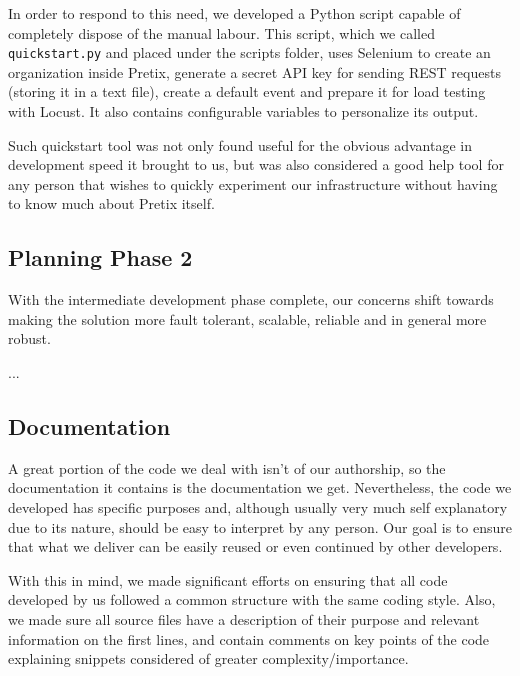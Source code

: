\documentclass[12pt]{article}
\begin{document}
In order to respond to this need, we developed a Python script capable of completely dispose of the manual labour.
This script, which we called \texttt{quickstart.py} and placed under the scripts folder, uses Selenium \cite{selenium} to create an organization inside Pretix, 
generate a secret API key for sending REST requests (storing it in a text file), create a default event and prepare it for load testing with Locust.
It also contains configurable variables to personalize its output.

Such quickstart tool was not only found useful for the obvious advantage in development speed it brought to us, but was also considered a good help tool for any 
person that wishes to quickly experiment our infrastructure without having to know much about Pretix itself.

\subsection{Planning Phase 2} \label{remarks.planning} %


With the intermediate development phase complete, our concerns shift towards making the solution more fault tolerant, scalable, reliable and in general more robust.

...

\subsection{Documentation} \label{remarks.documentation} %


A great portion of the code we deal with isn't of our authorship, so the documentation it contains is the documentation we get.
Nevertheless, the code we developed has specific purposes and, although usually very much self explanatory due to its nature, should be easy to interpret by any person.
Our goal is to ensure that what we deliver can be easily reused or even continued by other developers.

With this in mind, we made significant efforts on ensuring that all code developed by us followed a common structure with the same coding style.
Also, we made sure all source files have a description of their purpose and relevant information on the first lines, and contain comments on key points of the 
code explaining snippets considered of greater complexity/importance.
\end{document}
